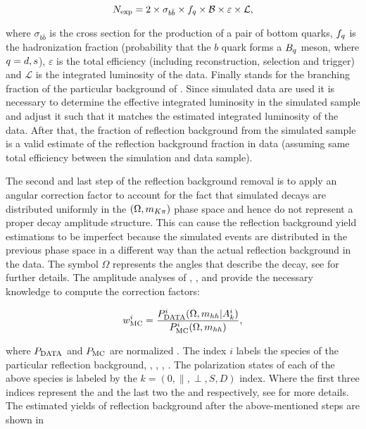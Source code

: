 \begin{equation}
N_{\rm exp} = 2 \times \sigma_{b\bar{b}}\times f_q \times {\ensuremath{\cal B}} \times \varepsilon \times {\mathcal{L}},
\end{equation}

\noindent where $\sigma_{b\bar{b}}$ is the cross section for the production of a pair of bottom quarks, $f_q$ is the hadronization fraction
(probability that the $b$ quark forms a $B_q$ meson, where $q=d,s$), $\varepsilon$ is the total efficiency (including reconstruction,
selection and trigger) and ${\mathcal{L}}$ is the integrated luminosity of the data. Finally \BF stands for the branching fraction
of the particular background of . Since simulated data are used it is necessary to determine
the effective integrated luminosity in the simulated sample and adjust it such that it matches the estimated integrated
luminosity of the data. After that, the fraction of reflection background from the simulated sample is a valid estimate
of the reflection background fraction in data (assuming same total efficiency between the simulation and data sample).

The second and last step of the reflection background removal is to apply an angular correction factor to account for
the fact that simulated decays are distributed uniformly in the $(\Omega, m_{K\pi})$ phase space and hence do not
represent a proper decay amplitude structure. This can cause the reflection background yield estimations to be
imperfect because the simulated events are distributed in the previous phase space in a different way than the
actual reflection background in the data. The symbol $\Omega$ represents the angles that describe the \BsJpsiKst
decay, see  for further details. The amplitude analyses of \BdJpsipipi \cite{SheldonBdpipi},
\BsJpsipipi \cite{SheldonBspipi}, \BsJpsiKK \cite{SheldonKK} and \LbJpsipK \cite{Gao:1701984} provide the necessary
knowledge to compute the correction factors:

\begin{equation}
\centering
w_{\rm MC}^i = \frac{P_{\rm DATA}^i (\Omega, \mhh  | A_k^i)} {P_{\rm MC}^i(\Omega, \mhh)},
\end{equation}

\noindent where $P_{\rm DATA}$ and $P_{\rm MC}$ are normalized \pdfs.
The index $i$ labels the species of the particular reflection background, \ie \BdJpsipipi, \BsJpsipipi, \BsJpsiKK, \LbJpsipK.
The polarization states of each of the above species is labeled by the $k=\left(0, \parallel, \perp, S, D \right)$ index.
Where the first three indices represent the \pwave and the last two the \swave and \dwave respectively,
see  for more details. The estimated yields of reflection background after
the above-mentioned steps are shown in 

